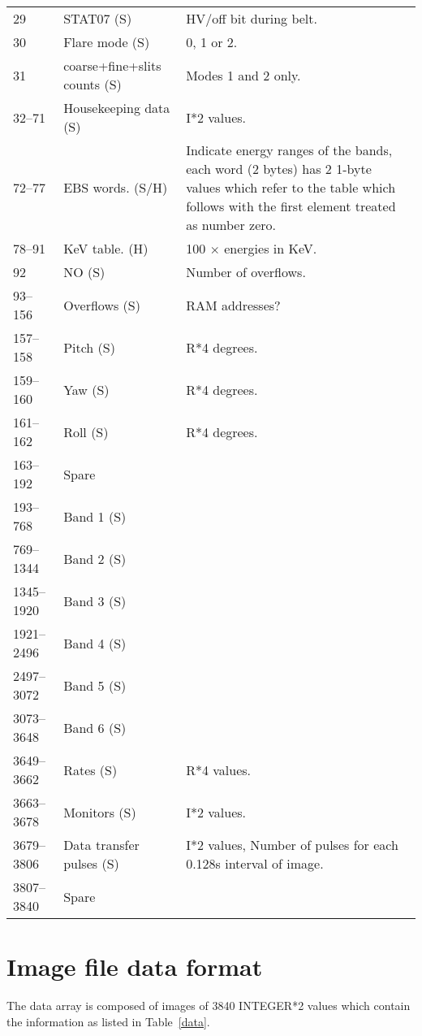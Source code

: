 \begin{table}
\begin{center}
{\begin{tabular}{|llp{75mm}|}
29 & STAT07 \hfill (S) & HV/off bit during belt.\\
30 & Flare mode \hfill(S) & 0, 1 or 2.\\
31 & coarse+fine+slits counts \hfill(S) & Modes 1 and 2 only.\\
32--71 & Housekeeping data \hfill(S) & I*2 values.\\
72--77 & EBS words. \hfill(S/H) & Indicate energy ranges of the bands, each word
(2 bytes) has 2 1-byte values which refer to the table which follows
with the first element treated as number zero.\\
78--91 & KeV table. \hfill(H) & 100 $\times$ energies in KeV.\\
92 & NO \hfill(S) & Number of overflows.\\
93--156 & Overflows \hfill(S) & RAM addresses? \\
157--158 & Pitch \hfill(S) & R*4 degrees.\\
159--160 & Yaw \hfill(S) & R*4 degrees.\\
161--162 & Roll \hfill(S) & R*4 degrees.\\
163--192 & Spare & \\
193--768 & Band 1 \hfill(S) & \\
769--1344 & Band 2 \hfill(S) & \\
1345--1920 & Band 3 \hfill(S) & \\
1921--2496 & Band 4 \hfill(S) & \\
2497--3072 & Band 5 \hfill(S) & \\
3073--3648 & Band 6 \hfill(S) & \\
3649--3662 & Rates \hfill(S) & R*4 values.\\
3663--3678 & Monitors \hfill(S) & I*2 values.\\
3679--3806 & Data transfer pulses \hfill(S) & I*2 values, Number of pulses
for each 0.128s interval of image.\\
3807--3840 & Spare & \\
\hline
\end{tabular}}
\end{center}
\end{table}

\section{Image file data format}
\label{DATA}

The data array is composed of images of 3840 INTEGER*2 values which
contain the information as listed in Table~\ref{data}.

